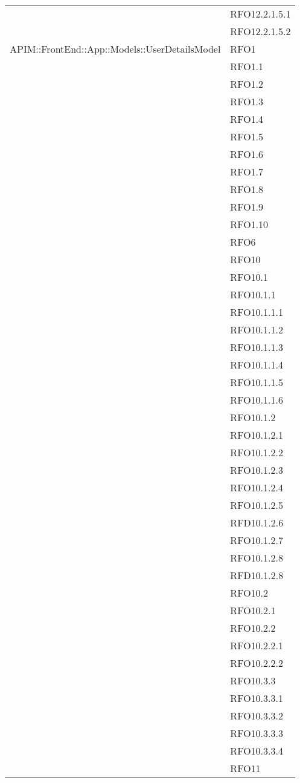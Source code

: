 \begin{longtable}{ p{12cm} | p{4cm} }
			& RFO12.2.1.5.1 \\
			& RFO12.2.1.5.2 \\
			\hline
			APIM::FrontEnd::App::Models::UserDetailsModel
			& RFO1 \\
			& RFO1.1 \\
			& RFO1.2 \\
			& RFO1.3 \\
			& RFO1.4 \\
			& RFO1.5 \\
			& RFO1.6 \\
			& RFO1.7 \\
			& RFO1.8 \\
			& RFO1.9 \\
			& RFO1.10 \\
			& RFO6 \\
			& RFO10 \\
			& RFO10.1 \\
			& RFO10.1.1 \\
			& RFO10.1.1.1 \\
			& RFO10.1.1.2 \\
			& RFO10.1.1.3 \\
			& RFO10.1.1.4 \\
			& RFO10.1.1.5 \\
			& RFO10.1.1.6 \\
			& RFO10.1.2 \\
			& RFO10.1.2.1 \\
			& RFO10.1.2.2 \\
			& RFO10.1.2.3 \\
			& RFO10.1.2.4 \\
			& RFO10.1.2.5 \\
			& RFD10.1.2.6 \\
			& RFO10.1.2.7 \\
			& RFO10.1.2.8 \\
			& RFD10.1.2.8 \\
			& RFO10.2 \\
			& RFO10.2.1 \\
			& RFO10.2.2 \\
			& RFO10.2.2.1 \\
			& RFO10.2.2.2 \\
			& RFO10.3.3 \\
			& RFO10.3.3.1 \\
			& RFO10.3.3.2 \\
			& RFO10.3.3.3 \\
			& RFO10.3.3.4 \\
			& RFO11 \\

\end{longtable}
